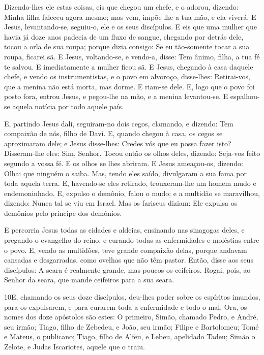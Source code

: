 Dizendo-lhes ele estas coisas, eis que chegou um chefe, e o
adorou, dizendo: Minha filha faleceu agora mesmo; mas vem, impõe-lhe
a tua mão, e ela viverá. E Jesus, levantando-se, seguiu-o,
ele e os seus discípulos. E eis que uma mulher que havia já
doze anos padecia de um fluxo de sangue, chegando por detrás dele,
tocou a orla de sua roupa; porque dizia consigo: Se eu
tão-somente tocar a sua roupa, ficarei sã. E Jesus,
voltando-se, e vendo-a, disse: Tem ânimo, filha, a tua fé te salvou.
E imediatamente a mulher ficou sã. E Jesus, chegando à casa
daquele chefe, e vendo os instrumentistas, e o povo em alvoroço,
disse-lhes: Retirai-vos, que a menina não está morta, mas
dorme. E riam-se dele. E, logo que o povo foi posto fora,
entrou Jesus, e pegou-lhe na mão, e a menina levantou-se. E
espalhou-se aquela notícia por todo aquele país.

E, partindo Jesus dali, seguiram-no dois cegos, clamando, e
dizendo: Tem compaixão de nós, filho de Davi. E, quando
chegou à casa, os cegos se aproximaram dele; e Jesus disse-lhes:
Credes vós que eu possa fazer isto? Disseram-lhe eles: Sim, Senhor.
Tocou então os olhos deles, dizendo: Seja-vos feito segundo a
vossa fé. E os olhos se lhes abriram. E Jesus ameaçou-os,
dizendo: Olhai que ninguém o saiba. Mas, tendo eles saído,
divulgaram a sua fama por toda aquela terra. E, havendo-se
eles retirado, trouxeram-lhe um homem mudo e endemoninhado.
E, expulso o demônio, falou o mudo; e a multidão se
maravilhou, dizendo: Nunca tal se viu em Israel. Mas os
fariseus diziam: Ele expulsa os demônios pelo príncipe dos demônios.

E percorria Jesus todas as cidades e aldeias, ensinando nas
sinagogas deles, e pregando o evangelho do reino, e curando todas as
enfermidades e moléstias entre o povo. E, vendo as multidões,
teve grande compaixão delas, porque andavam cansadas e desgarradas,
como ovelhas que não têm pastor. Então, disse aos seus
discípulos: A seara é realmente grande, mas poucos os ceifeiros.
Rogai, pois, ao Senhor da seara, que mande ceifeiros para a
sua seara.

\medskip

\lettrine{10} E, chamando os seus doze discípulos, deu-lhes
poder sobre os espíritos imundos, para os expulsarem, e para curarem
toda a enfermidade e todo o mal. Ora, os nomes dos doze
apóstolos são estes: O primeiro, Simão, chamado Pedro, e André, seu
irmão; Tiago, filho de Zebedeu, e João, seu irmão; Filipe e
Bartolomeu; Tomé e Mateus, o publicano; Tiago, filho de Alfeu, e
Lebeu, apelidado Tadeu; Simão o Zelote, e Judas Iscariotes,
aquele que o traiu.

